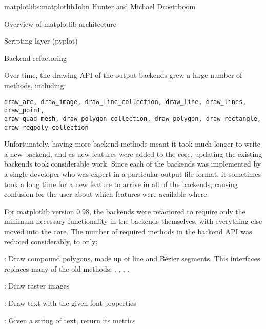 \begin{aosachapter}{matplotlib}{s:matplotlib}{John Hunter and Michael Droettboom}
\begin{aosasect1}{Overview of matplotlib architecture}
\begin{aosasect2}{Scripting layer (pyplot)}
\end{aosasect2}


\end{aosasect1}


\begin{aosasect1}{Backend refactoring}


Over time, the drawing API of the output backends grew a large number
of methods, including:

\begin{verbatim}
draw_arc, draw_image, draw_line_collection, draw_line, draw_lines, draw_point,
draw_quad_mesh, draw_polygon_collection, draw_polygon, draw_rectangle,
draw_regpoly_collection
\end{verbatim}

Unfortunately, having more backend methods meant it took much longer
to write a new backend, and as new features were added to the core,
updating the existing backends took considerable work.  Since each of
the backends was implemented by a single developer who was expert in a
particular output file format, it sometimes took a long time for a new
feature to arrive in all of the backends, causing confusion for the
user about which features were available where.

For matplotlib version 0.98, the backends were refactored to require
only the minimum necessary functionality in the backends themselves,
with everything else moved into the core.  The number of required
methods in the backend API was reduced considerably, to only:

\begin{aosaitemize}

  \item {}: Draw compound polygons, made up of line and
    B\'ezier segments.  This interfaces replaces many of the old
    methods: , , ,
    .

  \item {}: Draw raster images

  \item {}: Draw text with the given font properties

  \item {}: Given a string of
    text, return its metrics

\end{aosaitemize}


\end{aosasect1}
\end{aosachapter}
